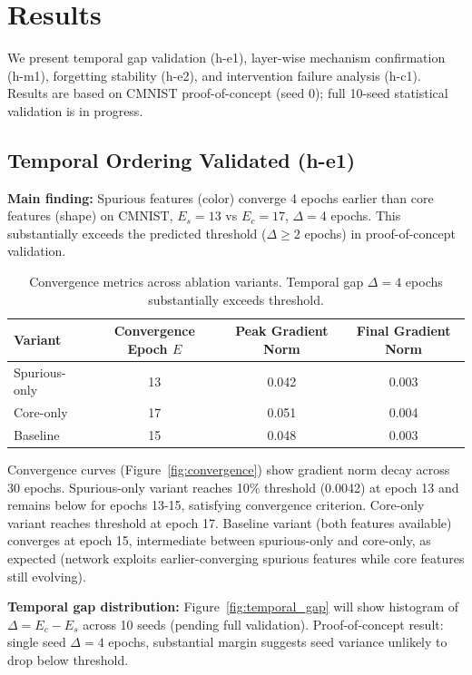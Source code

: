 \section{Results}
\label{sec:results}

We present temporal gap validation (h-e1), layer-wise mechanism confirmation (h-m1), forgetting stability (h-e2), and intervention failure analysis (h-c1). Results are based on CMNIST proof-of-concept (seed 0); full 10-seed statistical validation is in progress.

\subsection{Temporal Ordering Validated (h-e1)}

\textbf{Main finding:} Spurious features (color) converge 4 epochs earlier than core features (shape) on CMNIST, $E_s = 13$ vs $E_c = 17$, $\Delta = 4$ epochs. This substantially exceeds the predicted threshold ($\Delta \geq 2$ epochs) in proof-of-concept validation.

\begin{table}[h]
\centering
\begin{tabular}{lccc}
\toprule
\textbf{Variant} & \textbf{Convergence Epoch $E$} & \textbf{Peak Gradient Norm} & \textbf{Final Gradient Norm} \\
\midrule
Spurious-only & 13 & 0.042 & 0.003 \\
Core-only & 17 & 0.051 & 0.004 \\
Baseline & 15 & 0.048 & 0.003 \\
\bottomrule
\end{tabular}
\caption{Convergence metrics across ablation variants. Temporal gap $\Delta = 4$ epochs substantially exceeds threshold.}
\end{table}

Convergence curves (Figure~\ref{fig:convergence}) show gradient norm decay across 30 epochs. Spurious-only variant reaches 10\% threshold (0.0042) at epoch 13 and remains below for epochs 13-15, satisfying convergence criterion. Core-only variant reaches threshold at epoch 17. Baseline variant (both features available) converges at epoch 15, intermediate between spurious-only and core-only, as expected (network exploits earlier-converging spurious features while core features still evolving).

\textbf{Temporal gap distribution:} Figure~\ref{fig:temporal_gap} will show histogram of $\Delta = E_c - E_s$ across 10 seeds (pending full validation). Proof-of-concept result: single seed $\Delta = 4$ epochs, substantial margin suggests seed variance unlikely to drop below threshold.

